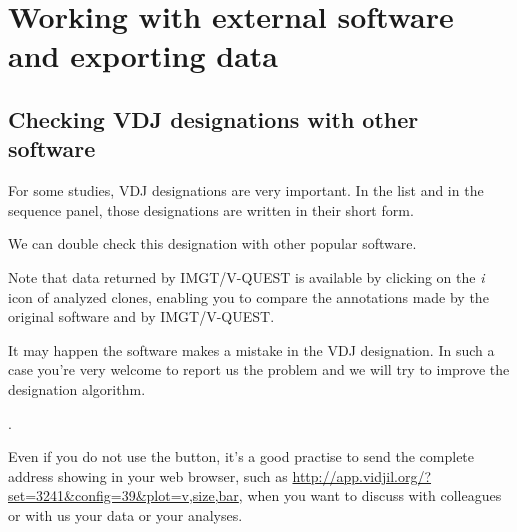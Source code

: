 
\section{Working with external software and exporting data}

\subsection{Checking VDJ designations with other software}
For some studies, VDJ designations are very important.
In the list and in the sequence panel, those designations are written in their
short form.


We can double check this designation with other popular software.
  
Note that data returned by IMGT/V-QUEST is available by clicking on the \textit{i} icon of analyzed clones,
enabling you to compare the annotations made by the original software and by IMGT/V-QUEST. 


\bigskip

It may happen the software makes a mistake in the VDJ designation.
In such a case you're very welcome to report us the problem
and we will try to improve the designation algorithm.

.

Even if you do not use the  button, it's a good practise
to send the complete address showing in your web browser, such
as  \url{http://app.vidjil.org/?set=3241&config=39&plot=v,size,bar},
when you want to discuss with colleagues or with us your data or your analyses.

